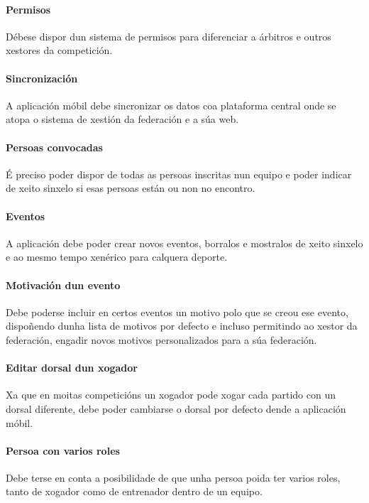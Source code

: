   \paragraph{Permisos}
  Débese dispor dun sistema de permisos para diferenciar a árbitros e outros 
xestores da competición.

  \paragraph{Sincronización}
  A aplicación móbil debe sincronizar os datos coa plataforma central onde se 
atopa o sistema de xestión da federación e a súa web.

  \paragraph{Persoas convocadas}
  É preciso poder dispor de todas as persoas inscritas nun equipo e poder 
indicar de xeito sinxelo si esas persoas están ou non no encontro.
  
  \paragraph{Eventos}
  A aplicación debe poder crear novos eventos, borralos e mostralos de xeito 
sinxelo e ao mesmo tempo xenérico para calquera deporte.
  
  \paragraph{Motivación dun evento}
  Debe poderse incluir en certos eventos un motivo polo que se creou ese 
evento, dispoñendo dunha lista de motivos por defecto e incluso permitindo ao 
xestor da federación, engadir novos motivos personalizados para a súa 
federación.

  \paragraph{Editar dorsal dun xogador}
  Xa que en moitas competicións un xogador pode xogar cada partido con un 
dorsal diferente, debe poder cambiarse o dorsal por defecto dende a aplicación 
móbil.

  \paragraph{Persoa con varios roles}
  Debe terse en conta a posibilidade de que unha persoa poida ter varios roles, 
tanto de xogador como de entrenador dentro de un equipo.
  
